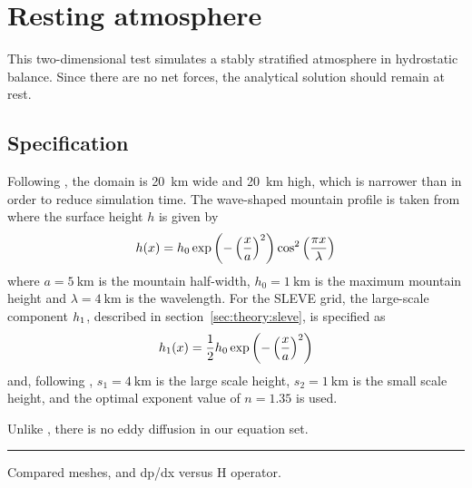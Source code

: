 \section{Resting atmosphere}
This two-dimensional test simulates a stably stratified atmosphere in hydrostatic balance.  Since there are no net forces, the analytical solution should remain at rest.  

\subsection{Specification}
Following \textcite{weller-shahrokhi2014}, the domain is \SI{20}{\kilo\meter} wide and \SI{20}{\kilo\meter} high, which is narrower than \textcite{klemp2011} in order to reduce simulation time.  The wave-shaped mountain profile is taken from \textcite{schaer2002} where the surface height $h$ is given by
\begin{align}
h(x) = h_0 \exp \left( - \left( \frac{x}{a} \right)^2 \right) \cos^2 \left( \frac{\pi x}{\lambda} \right)
\end{align}
where $a = \SI{5}{\kilo\meter}$ is the mountain half-width, $h_0 = \SI{1}{\kilo\meter}$ is the maximum mountain height and $\lambda = \SI{4}{\kilo\meter}$ is the wavelength.  For the SLEVE grid, the large-scale component $h_1$, described in section~\ref{sec:theory:sleve}, is specified as
\begin{align}
h_1(x) = \frac{1}{2} h_0 \exp \left( - \left( \frac{x}{a} \right)^2 \right)
\end{align}
and, following \cite{leuenberger2010}, $s_1 = \SI{4}{\kilo\meter}$ is the large scale height, $s_2 = \SI{1}{\kilo\meter}$ is the small scale height, and the optimal exponent value of $n = 1.35$ is used.

Unlike \textcite{klemp2011}, there is no eddy diffusion in our equation set.


\hrule

Compared meshes, and dp/dx versus H operator.

